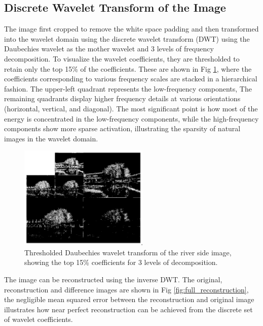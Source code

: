\documentclass[11pt]{article}
\begin{document}
\subsection{Discrete Wavelet Transform of the Image}
The image first cropped to remove the white space padding and then transformed into the wavelet domain using the discrete wavelet transform (DWT) using the Daubechies wavelet as the mother wavelet and 3 levels of frequency decomposition. To visualize the wavelet coefficients, they are thresholded to retain only the top 15\% of the coefficients. These are shown in Fig \ref{fig:wavelet_coefficients}, where the coefficients corresponding to various frequency scales are stacked in a hierarchical fashion. The upper-left quadrant represents the low-frequency components,  The remaining quadrants display higher frequency details at various orientations (horizontal, vertical, and diagonal). The most significant point is how most of the energy is concentrated in the low-frequency components, while the high-frequency components show more sparse activation, illustrating the sparsity of natural images in the wavelet domain.

\begin{figure}[H]
    \centering
    \includegraphics[width=0.55\textwidth]{figs/q2c_river_side_wavelet_transform.jpeg}
    \caption{Thresholded Daubechies wavelet transform of the river side image, showing the top 15\% coefficients for 3 levels of decomposition.}
    \label{fig:wavelet_coefficients}
\end{figure}

The image can be reconstructed using the inverse DWT. The original, reconstruction and difference images are shown in Fig \ref{fig:full_reconstruction}, the negligible mean squared error between the reconstruction and original image illustrates how near perfect reconstruction can be achieved from the discrete set of wavelet coefficients. 
\end{document}
